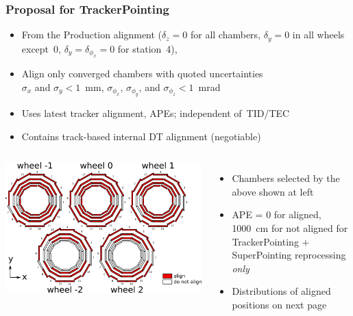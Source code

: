 \documentclass[compress]{beamer}
\begin{document}
\begin{frame}
\frametitle{Proposal for TrackerPointing}

\begin{itemize}
\item From the Production alignment ($\delta_z = 0$ for all chambers, $\delta_y = 0$ in all wheels except~0, $\delta_y = \delta_{\phi_x} = 0$ for station~4),
\item Align only converged chambers with quoted uncertainties \\ $\sigma_x$ and $\sigma_y < 1$~mm, $\sigma_{\phi_x}$, $\sigma_{\phi_y}$, and $\sigma_{\phi_z} < 1$~mrad
\item Uses latest tracker alignment, APEs; independent \mbox{of TID/TEC\hspace{-1 cm}}
\item Contains track-based internal DT alignment (negotiable)
\end{itemize}

\begin{columns}
\includegraphics[width=1.1\linewidth]{data_final_map.pdf}
\begin{itemize}
\item Chambers selected by the above shown at left
\item APE = 0 for aligned, 1000~cm for not aligned for \mbox{TrackerPointing\hspace{-0.5 cm}} $+$ SuperPointing reprocessing {\it only}
\item Distributions of aligned positions on next page
\end{itemize}
\end{columns}
\end{frame}
\end{document}
